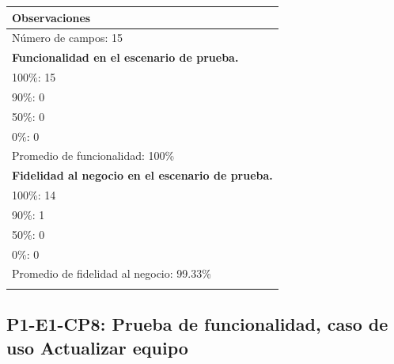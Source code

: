 \documentclass[oneside,10pt]{book}
\begin{document}
\begin{tabularx}{\textwidth}{ X }
\multicolumn{1}{X}{\cellcolor[HTML]{9B9B9B}\textbf{Observaciones}} \\ \hline
\multicolumn{1}{|l|}{Número de campos: 15 }	\\
\multicolumn{1}{|l|}{\textbf{Funcionalidad en el escenario de prueba.} }	\\
\multicolumn{1}{|l|}{100\%: 15 }	\\
\multicolumn{1}{|l|}{90\%: 0 }	\\
\multicolumn{1}{|l|}{50\%: 0 }	\\
\multicolumn{1}{|l|}{0\%: 0 }	\\
\multicolumn{1}{|l|}{Promedio de funcionalidad: 100\% }	\\
\multicolumn{1}{|l|}{\textbf{Fidelidad al negocio en el escenario de prueba.} }	\\
\multicolumn{1}{|l|}{100\%: 14 }	\\
\multicolumn{1}{|l|}{90\%: 1 }	\\
\multicolumn{1}{|l|}{50\%: 0 }	\\
\multicolumn{1}{|l|}{0\%: 0 }	\\
\multicolumn{1}{|l|}{Promedio de fidelidad al negocio: 99.33\% }	\\
\multicolumn{1}{|l|}{ }	\\ \hline
\end{tabularx}

\newpage

\subsection{P1-E1-CP8: Prueba de funcionalidad, caso de uso Actualizar equipo}
\end{document}
